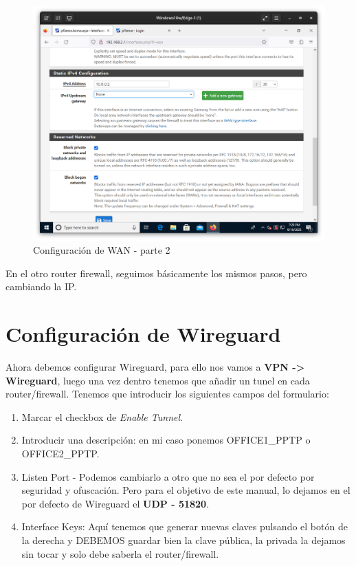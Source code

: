 \begin{figure}[H]
	\centering
	\includegraphics[scale=0.30]{03}
	\caption{Configuración de WAN - parte 2}
\end{figure}

En el otro router firewall, seguimos básicamente los mismos pasos, pero cambiando la IP.

\newpage
\section{Configuración de Wireguard}

Ahora debemos configurar Wireguard, para ello nos vamos a \textbf{VPN -> Wireguard}, luego una vez dentro tenemos que añadir un tunel en cada router/firewall. Tenemos que introducir los siguientes campos del formulario: 

\begin{enumerate}
    \item Marcar el checkbox de \emph{Enable Tunnel}.
    \item Introducir una descripción: en mi caso ponemos OFFICE1\_PPTP o OFFICE2\_PPTP.
    \item Listen Port - Podemos cambiarlo a otro que no sea el por defecto por seguridad y ofuscación. Pero para el objetivo de este manual, lo dejamos en el por defecto de Wireguard el \textbf{UDP - 51820}.
    \item Interface Keys: Aquí tenemos que generar nuevas claves pulsando el botón de la derecha y DEBEMOS guardar bien la clave pública, la privada la dejamos sin tocar y solo debe saberla el router/firewall.
\end{enumerate}

